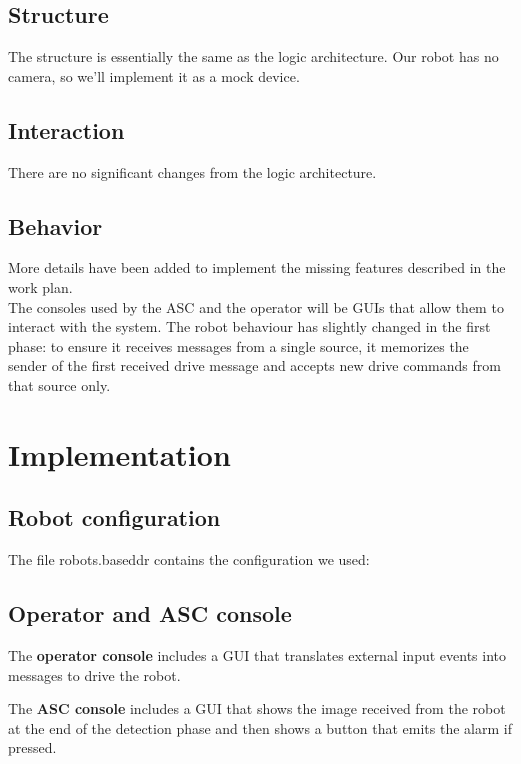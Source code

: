 \documentclass{llncs}
\newcommand{\labelsec}[1]{\label{sec:#1}}
\begin{document}
\subsection{Structure}
The structure is essentially the same as the logic architecture. Our robot has no camera, so we'll implement it as a mock device.
\subsection{Interaction}
There are no significant changes from the logic architecture.
\subsection{Behavior}
More details have been added to implement the missing features described in the work plan.\\
The consoles used by the ASC and the operator will be GUIs that allow them to interact with the system.
The robot behaviour has slightly changed in the first phase: to ensure it receives messages from a single source, it memorizes the sender of the first received drive message and accepts new drive commands from that source only.

\newpage
\section{Implementation}
\labelsec{Implementation}
\subsection{Robot configuration}
The file robots.baseddr contains the configuration we used:

\subsection{Operator and ASC console}
The \textbf{operator console} includes a GUI that translates external input events into messages to drive the robot.

The \textbf{ASC console} includes a GUI that shows the image received from the robot at the end of the detection phase and then shows a button that emits the alarm if pressed.

\end{document}
